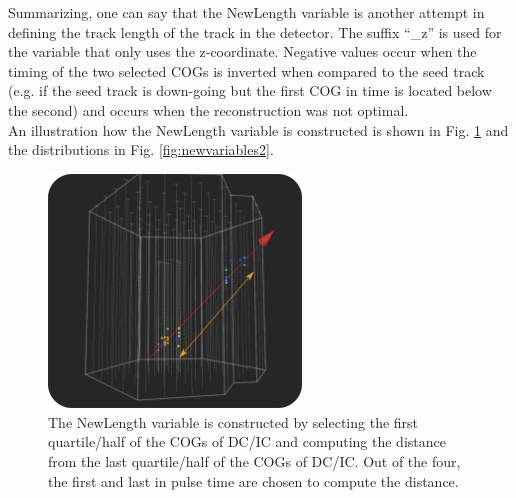 \noindent Summarizing, one can say that the NewLength variable is another attempt in defining the track length of the track in the detector. The suffix ``\_z'' is used for the variable that only uses the z-coordinate. Negative values occur when the timing of the two selected COGs is inverted when compared to the seed track (e.g. if the seed track is down-going but the first COG in time is located below the second) and occurs when the reconstruction was not optimal.\\

\noindent An illustration how the NewLength variable is constructed is shown in Fig. \ref{fig:newlength} and the distributions in Fig. \ref{fig:newvariables2}.

\begin{figure}
\centering
\includegraphics[width=0.6\textwidth]{chapter8/img/newlengthillustration_extra.png}
\caption{The NewLength variable is constructed by selecting the first quartile/half of the COGs of DC/IC and computing the distance from the last quartile/half of the COGs of DC/IC. Out of the four, the first and last in pulse time are chosen to compute the distance.}
\label{fig:newlength}
\end{figure}
 


